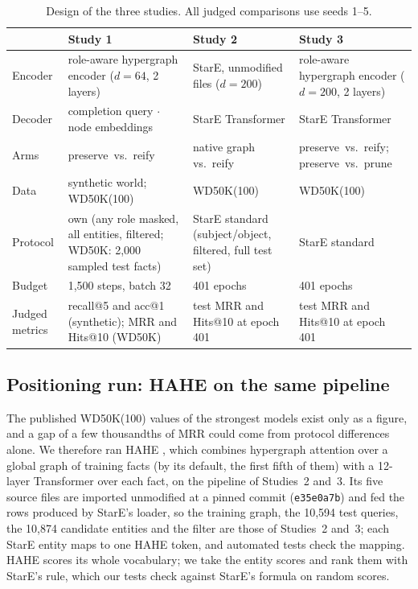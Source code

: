 \documentclass[11pt,a4paper]{article}
\newcommand{\hyper}{\textsf{preserve}}
\newcommand{\reif}{\textsf{reify}}
\newcommand{\prune}{\textsf{prune}}
\begin{document}
\begin{table}[t]
\centering
\footnotesize
\caption{Design of the three studies. All judged comparisons use seeds 1--5.}
\label{tab:design}
\begin{tabular}{@{}p{1.9cm}p{4.2cm}p{4.2cm}p{4.2cm}@{}}
\toprule
 & Study 1 & Study 2 & Study 3 \\
\midrule
Encoder & role-aware hypergraph encoder ($d=64$, 2 layers) & StarE, unmodified files ($d=200$) & role-aware hypergraph encoder ($d=200$, 2 layers) \\
Decoder & completion query $\cdot$ node embeddings & StarE Transformer & StarE Transformer \\
Arms & \hyper\ vs.\ \reif & native graph vs.\ \reif & \hyper\ vs.\ \reif; \hyper\ vs.\ \prune \\
Data & synthetic world; WD50K(100) & WD50K(100) & WD50K(100) \\
Protocol & own (any role masked, all entities, filtered; WD50K: 2,000 sampled test facts) & StarE standard (subject/object, filtered, full test set) & StarE standard \\
Budget & 1,500 steps, batch 32 & 401 epochs & 401 epochs \\
Judged metrics & recall@5 and acc@1 (synthetic); MRR and Hits@10 (WD50K) & test MRR and Hits@10 at epoch 401 & test MRR and Hits@10 at epoch 401 \\
\bottomrule
\end{tabular}
\end{table}

\subsection{Positioning run: HAHE on the same pipeline}
\label{sec:hahe-design}

The published WD50K(100) values of the strongest models exist only as a figure, and a gap of a few thousandths of MRR could come from protocol differences alone. We therefore ran HAHE \citep{luo2023hahe}, which combines hypergraph attention over a global graph of training facts (by its default, the first fifth of them) with a 12-layer Transformer over each fact, on the pipeline of Studies~2 and~3. Its five source files are imported unmodified at a pinned commit (\texttt{e35e0a7b}) and fed the rows produced by StarE's loader, so the training graph, the 10,594 test queries, the 10,874 candidate entities and the filter are those of Studies~2 and~3; each StarE entity maps to one HAHE token, and automated tests check the mapping. HAHE scores its whole vocabulary; we take the entity scores and rank them with StarE's rule, which our tests check against StarE's formula on random scores.
\end{document}
